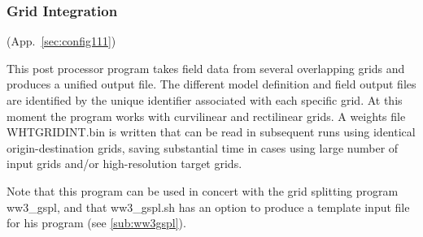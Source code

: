 \vsssub
\subsubsection{Grid Integration} \label{sub:ww3gint}
\vsssub
{}
 (App.~\ref{sec:config111})

\vspace{\baselineskip}
\noindent
This post processor program takes field data from several overlapping grids
and produces a unified output file. The different model definition and field
output files are identified by the unique identifier associated with each
specific grid. At this moment the program works with curvilinear and
rectilinear grids. A weights file {\file WHTGRIDINT.bin} is written 
that can be read in subsequent runs using identical origin-destination grids, 
saving substantial time in cases using large number of input grids and/or 
high-resolution target grids.

\vspace{\baselineskip}
\vspace{\baselineskip}
\noindent
Note that this program can be used in concert with the grid splitting program
{\file ww3\_gspl}, and that {\file ww3\_gspl.sh} has an option to produce a
template input file for his program (see \para\ref{sub:ww3gspl}).

\pb
